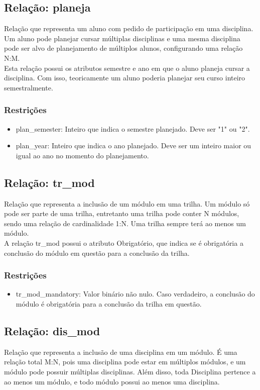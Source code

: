 \documentclass{article}
\begin{document}
  	\subsection{Relação: planeja}
  	    \quad Relação que representa um aluno com pedido de participação em uma disciplina. Um aluno pode planejar cursar múltiplas disciplinas e uma mesma disciplina pode ser alvo de planejamento de múltiplos alunos, configurando uma relação N:M. \\
  	    \quad Esta relação possui os atributos semestre e ano em que o aluno planeja cursar a disciplina. Com isso, teoricamente um aluno poderia planejar seu curso inteiro semestralmente.
  	    \subsubsection{Restrições}
  	        \begin{itemize}
  	            \item plan\_semester: Inteiro que indica o semestre planejado. Deve ser "1" ou "2".
  	            \item plan\_year: Inteiro que indica o ano planejado. Deve ser um inteiro maior ou igual ao ano no momento do planejamento.
  	        \end{itemize}
  	
  	\subsection{Relação: tr\_mod}
  	    \quad Relação que representa a inclusão de um módulo em uma trilha. Um módulo só pode ser parte de uma trilha, entretanto uma trilha pode conter N módulos, sendo uma relação de cardinalidade 1:N. Uma trilha sempre terá ao menos um módulo. \\
  	    \quad A relação tr\_mod possui o atributo Obrigatório, que indica se é obrigatória a conclusão do módulo em questão para a conclusão da trilha.
  	    \subsubsection{Restrições}
  	        \begin{itemize}
  	            \item tr\_mod\_mandatory: Valor binário não nulo. Caso verdadeiro, a conclusão do módulo é obrigatória para a conclusão da trilha em questão.
  		    \end{itemize}
  	   
  	\subsection{Relação: dis\_mod}
  	    \quad Relação que representa a inclusão de uma disciplina em um módulo. É uma relação total M:N, pois uma disciplina pode estar em múltiplos módulos, e um módulo pode possuir múltiplas disciplinas. Além disso, toda Disciplina pertence a ao menos um módulo, e todo módulo possui ao menos uma disciplina.
  	
\end{document}
